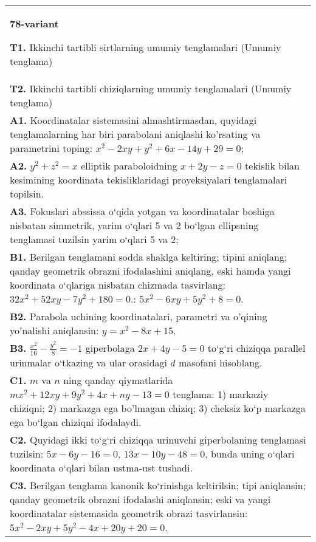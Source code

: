\documentclass{article}
\begin{document}
\begin{tabular}{m{17cm}}
\textbf{78-variant}
\newline

\textbf{T1.} Ikkinchi tartibli sirtlarning umumiy tenglamalari (Umumiy tenglama) \\
\textbf{T2.} Ikkinchi tartibli chiziqlarning umumiy tenglamalari (Umumiy tenglama) \\
\textbf{A1.} Koordinatalar sistemasini almashtirmasdan, quyidagi tenglamalarning har biri parabolani aniqlashi ko'rsating va parametrini toping: $x^2-2 x y+y^2+6 x-14 y+29=0$; \\
\textbf{A2.} $y^2+z^2=x$ elliptik paraboloidning $x+2 y-z=0$ tekislik bilan kesimining koordinata tekisliklaridagi proyeksiyalari tenglamalari topilsin. \\
\textbf{A3.} Fokuslari abssissa o‘qida yotgan va koordinatalar boshiga nisbatan simmetrik, yarim o‘qlari 5 va 2 bo‘lgan ellipsning tenglamasi tuzilsin yarim o‘qlari 5 va 2; \\
\textbf{B1.} Berilgan tenglamani sodda shaklga keltiring; tipini aniqlang; qanday geometrik obrazni ifodalashini aniqlang, eski hamda yangi koordinata o‘qlariga nisbatan chizmada tasvirlang: $32x^2+52xy-7y^2+180=0$.: $5 x^2-6 x y+5 y^2+8=0$. \\
\textbf{B2.} Parabola uchining koordinatalari, parametri va o'qining yo'nalishi aniqlansin: $y=x^2-8 x+15$, \\
\textbf{B3.} $\frac{x^2}{16}-\frac{y^2}{8}=-1$ giperbolaga $2 x+4 y-5=0$ to‘g‘ri chiziqqa parallel urinmalar o‘tkazing va ular orasidagi $d$ masofani hisoblang. \\
\textbf{C1.} $m$ va $n$ ning qanday qiymatlarida $m x^2+12 x y+9 y^2+4 x+n y-13=0$ tenglama: 1) markaziy chiziqni; 2) markazga ega bo'lmagan chiziq; 3) cheksiz ko‘p markazga ega bo‘lgan chiziqni ifodalaydi. \\
\textbf{C2.} Quyidagi ikki to‘g‘ri chiziqqa urinuvchi giperbolaning tenglamasi tuzilsin: $5x-6y-16=0$, $13x-10y-48=0$, bunda uning o‘qlari koordinata o‘qlari bilan ustma-ust tushadi. \\
\textbf{C3.} Berilgan tenglama kanonik ko‘rinishga keltirilsin; tipi aniqlansin; qanday geometrik obrazni ifodalashi aniqlansin; eski va yangi koordinatalar sistemasida geometrik obrazi tasvirlansin: $5 x^2-2 x y+5 y^2-4 x+20 y+20=0$. \\

\end{tabular}
\vspace{1cm}
\end{document}
